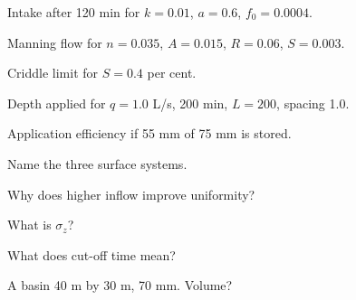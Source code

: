 \begin{exlist}
\item Intake after 120 min for $k=0.01$, $a=0.6$, $f_0=0.0004$.
\item Manning flow for $n=0.035$, $A=0.015$, $R=0.06$, $S=0.003$.
\item Criddle limit for $S=0.4$ per cent.
\item Depth applied for $q=1.0$ L/s, 200 min, $L=200$, spacing 1.0.\exans{60 mm}
\item Application efficiency if 55 mm of 75 mm is stored.
\item Name the three surface systems.
\item Why does higher inflow improve uniformity?
\item What is $\sigma_z$?
\item What does cut-off time mean?
\item A basin 40 m by 30 m, 70 mm. Volume?
\end{exlist}
